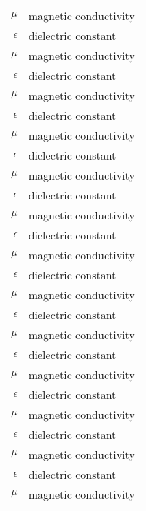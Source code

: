 \begin{longtable}{rl}
  $\mu$      & magnetic conductivity \\
  $\epsilon$ & dielectric constant   \\
  $\mu$      & magnetic conductivity \\
  $\epsilon$ & dielectric constant   \\
  $\mu$      & magnetic conductivity \\
  $\epsilon$ & dielectric constant   \\
  $\mu$      & magnetic conductivity \\
  $\epsilon$ & dielectric constant   \\
  $\mu$      & magnetic conductivity \\
  $\epsilon$ & dielectric constant   \\
  $\mu$      & magnetic conductivity \\
  $\epsilon$ & dielectric constant   \\
  $\mu$      & magnetic conductivity \\
  $\epsilon$ & dielectric constant   \\
  $\mu$      & magnetic conductivity \\
  $\epsilon$ & dielectric constant   \\
  $\mu$      & magnetic conductivity \\
  $\epsilon$ & dielectric constant   \\
  $\mu$      & magnetic conductivity \\
  $\epsilon$ & dielectric constant   \\
  $\mu$      & magnetic conductivity \\
  $\epsilon$ & dielectric constant   \\
  $\mu$      & magnetic conductivity \\
  $\epsilon$ & dielectric constant   \\
  $\mu$      & magnetic conductivity \\
\end{longtable}
